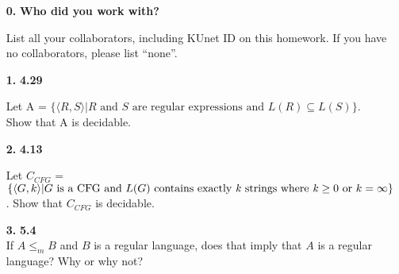 \begin{enumerate}

\item[\textbf{0.}] \textbf{Who did you work with?}

List all your collaborators, including KUnet ID on this homework. If you have no collaborators, please list ``none''.

\iffull
{}
\fi

\pagebreak


\item[\textbf{1.}] \textbf{4.29}

Let A = $\{\langle R, S \rangle | R \textrm{ and } S \textrm{ are regular expressions and } L(R) \subseteq L(S) \}$. Show that A is decidable. 
\newline\newline
\answer{}
\pagebreak


\item[\textbf{2.}] \textbf{4.13}

Let $\mathit{C}_{CFG}$ = $\{\langle G, k \rangle | G \textrm{ is a CFG and } L(G) \textrm{ contains exactly \textit{k} strings where \textit{k}} \geq 0 \textrm{ or } k = \infty \}$. Show that $\mathit{C}_{CFG}$ is decidable. 
\newline\newline
\answer{}

\pagebreak




\item[\textbf{3.}] \textbf{5.4} \\
If $A \leq_{m} B$ and $B$ is a regular language, does that imply that $A$ is a regular language? Why or why not?
\newline\newline
\answer{}

\pagebreak




\end{enumerate}
